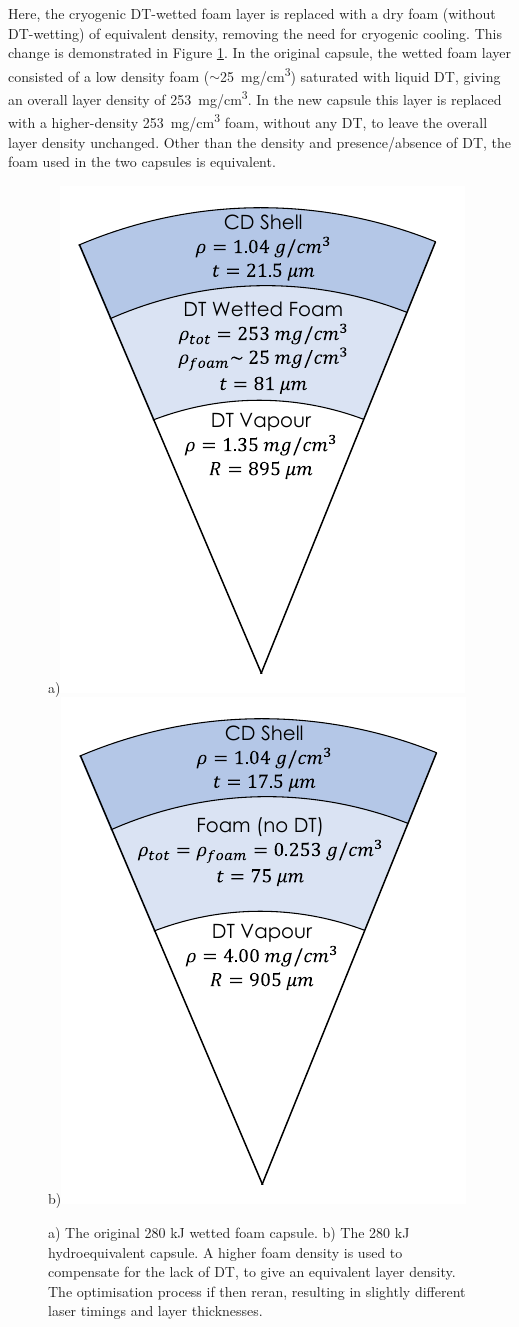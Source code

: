 Here, the cryogenic DT-wetted foam layer is replaced with a dry foam (without DT-wetting) of equivalent density, removing the need for cryogenic cooling. This change is demonstrated in Figure \ref{fig:Hydroequivalent}. In the original capsule, the wetted foam layer consisted of a low density foam ($\sim$25~\si[per-mode=symbol]{\milli\gram\per\centi\meter\cubed}) saturated with liquid DT, giving an overall layer density of 253~\si[per-mode=symbol]{\milli\gram\per\centi\meter\cubed}. In the new capsule this layer is replaced with a higher-density 253~\si[per-mode=symbol]{\milli\gram\per\centi\meter\cubed} foam, without any DT, to leave the overall layer density  unchanged. Other than the density and presence/absence of DT, the foam used in the two capsules is equivalent.

\begin{figure} 
\centering     %
\subfigure a){\label{fig:280Cap}\includegraphics[width=.35\textwidth]{figures/LowCR/280Capsule.pdf}}
\subfigure b){\label{fig:280Hydro}\includegraphics[width=.35\textwidth]{figures/LowCR/280Hydro.pdf}}
\caption{\label{fig:Hydroequivalent} a) The original 280 kJ wetted foam capsule. b) The 280 kJ hydroequivalent capsule. A higher foam density is used to compensate for the lack of DT, to give an equivalent layer density. The optimisation process if then reran, resulting in slightly different laser timings and layer thicknesses.}
\end{figure}

